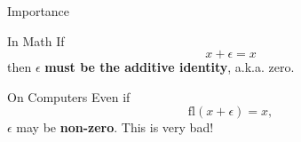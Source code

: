 \documentclass[10pt]{beamer}
\begin{document}
\begin{frame}{Importance}

    \begin{block}{In Math}
    If
    $$
    x+\epsilon = x
    $$
    then $\epsilon$ \textbf{must be the additive identity}, a.k.a. zero.
    \end{block}
    \vfill 

    \begin{block}{On Computers}
    Even if
    $$
    \mathrm{fl}(x+\epsilon) = x,
    $$
    $\epsilon$ may be \textbf{non-zero}. This is very bad!
    \end{block}


    
\end{frame}

\end{document}
